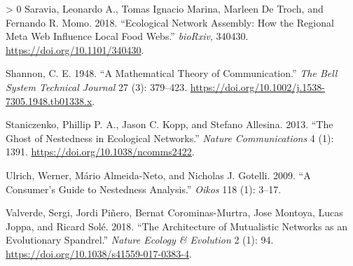 \documentclass[10pt,oneside]{article}
\newlength{\cslhangindent}
\newenvironment{CSLReferences}[3] %
 {%
  \setlength{\parindent}{0pt}
  \ifodd #1 \everypar{\setlength{\hangindent}{\cslhangindent}}\ignorespaces\fi
  \ifnum #2 > 0
  \setlength{\parskip}{#2\baselineskip}
  \fi
 }%
 {}
\begin{document}
\begin{CSLReferences}{1}{0}
\leavevmode\hypertarget{ref-Saravia2018EcoNet}{}%
Saravia, Leonardo A., Tomas Ignacio Marina, Marleen De Troch, and
Fernando R. Momo. 2018. {``Ecological Network Assembly: How the Regional
Meta Web Influence Local Food Webs.''} \emph{bioRxiv}, 340430.
\url{https://doi.org/10.1101/340430}.

\leavevmode\hypertarget{ref-Shannon1948MatThe}{}%
Shannon, C. E. 1948. {``A Mathematical Theory of Communication.''}
\emph{The Bell System Technical Journal} 27 (3): 379--423.
\url{https://doi.org/10.1002/j.1538-7305.1948.tb01338.x}.

\leavevmode\hypertarget{ref-Staniczenko2013GhoNes}{}%
Staniczenko, Phillip P. A., Jason C. Kopp, and Stefano Allesina. 2013.
{``The Ghost of Nestedness in Ecological Networks.''} \emph{Nature
Communications} 4 (1): 1391. \url{https://doi.org/10.1038/ncomms2422}.

\leavevmode\hypertarget{ref-Ulrich2009ConSG}{}%
Ulrich, Werner, Mário Almeida-Neto, and Nicholas J. Gotelli. 2009. {``A
Consumer's Guide to Nestedness Analysis.''} \emph{Oikos} 118 (1): 3--17.

\leavevmode\hypertarget{ref-Valverde2018ArcMut}{}%
Valverde, Sergi, Jordi Piñero, Bernat Corominas-Murtra, Jose Montoya,
Lucas Joppa, and Ricard Solé. 2018. {``The Architecture of Mutualistic
Networks as an Evolutionary Spandrel.''} \emph{Nature Ecology \&
Evolution} 2 (1): 94. \url{https://doi.org/10.1038/s41559-017-0383-4}.

\end{CSLReferences}
\end{document}
